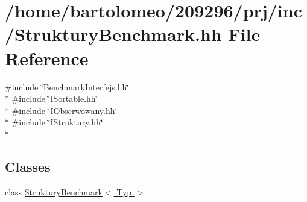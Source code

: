 \hypertarget{_struktury_benchmark_8hh}{\section{/home/bartolomeo/209296/prj/inc/\-Struktury\-Benchmark.hh File Reference}
\label{_struktury_benchmark_8hh}
}
{\ttfamily \#include \char`\"{}Benchmark\-Interfejs.\-hh\char`\"{}}\\*
{\ttfamily \#include \char`\"{}I\-Sortable.\-hh\char`\"{}}\\*
{\ttfamily \#include \char`\"{}I\-Obserwowany.\-hh\char`\"{}}\\*
{\ttfamily \#include \char`\"{}I\-Struktury.\-hh\char`\"{}}\\*
\subsection*{Classes}
\begin{DoxyCompactItemize}
\item 
class \hyperlink{class_struktury_benchmark}{Struktury\-Benchmark$<$ Typ $>$}
\end{DoxyCompactItemize}

